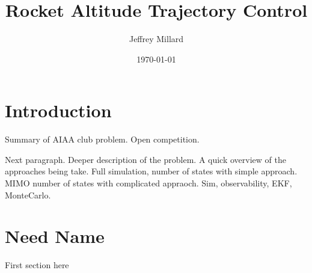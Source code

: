 \documentclass{article}
\title{Rocket Altitude Trajectory Control}
\date{\today}
\author{Jeffrey Millard}
\begin{document}
\maketitle


\section{Introduction}
  Summary of AIAA club problem. Open competition.

  Next paragraph. Deeper description of the problem. A quick overview of the approaches being take. Full simulation, number of states with simple approach. MIMO number of states with complicated appraoch. Sim, observability, EKF, MonteCarlo.

\section{Need Name}
  First section here
\end{document}
